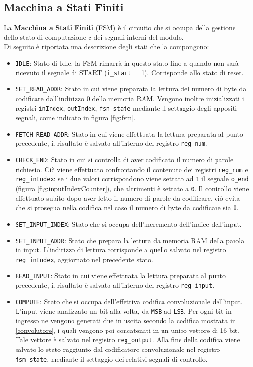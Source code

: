 \documentclass{article}
\begin{document}
\newpage
\subsection{Macchina a Stati Finiti}
\label{fsm}
La \textbf{Macchina a Stati Finiti} (FSM) è il circuito che si occupa della gestione dello stato di computazione e dei segnali interni del modulo.\\
Di seguito è riportata una descrizione degli stati che la compongono:

\begin{itemize}
    \item \texttt{IDLE}: Stato di Idle, la FSM rimarrà in questo stato fino a quando non sarà ricevuto il segnale di START (\texttt{i\_start} = 1). Corrisponde allo stato di reset.
    \item \texttt{SET\_READ\_ADDR}: Stato in cui viene preparata la lettura del numero di byte da codificare dall'indirizzo 0 della memoria RAM. Vengono inoltre inizializzati i registri \texttt{inIndex}, \texttt{outIndex}, \texttt{fsm\_state} mediante il settaggio degli appositi segnali, come indicato in figura \ref{fig:fsm}.
    \item \texttt{FETCH\_READ\_ADDR}: Stato in cui viene effettuata la lettura preparata al punto precedente, il risultato è salvato all'interno del registro \texttt{reg\_num}.
    \item \texttt{CHECK\_END}: Stato in cui si controlla di aver codificato il numero di parole richiesto. Ciò viene effettuato confrontando il contenuto dei registri \texttt{reg\_num} e \texttt{reg\_inIndex}: se i due valori corrispondono viene settato ad \texttt{1} il segnale \texttt{o\_end} (figura \ref{fig:inputIndexCounter}), che altrimenti è settato a \texttt{0}. Il controllo viene effettuato subito dopo aver letto il numero di parole da codificare, ciò evita che si prosegua nella codifica nel caso il numero di byte da codificare sia 0.
    \item \texttt{SET\_INPUT\_INDEX}: Stato che si occupa dell'incremento dell'indice dell'input.
    \item \texttt{SET\_INPUT\_ADDR}: Stato che prepara la lettura da memoria RAM della parola in input. L'indirizzo di lettura corrisponde a quello salvato nel registro \texttt{reg\_inIndex}, aggiornato nel precedente stato.
    \item \texttt{READ\_INPUT}: Stato in cui viene effettuata la lettura preparata al punto precedente, il risultato è salvato all'interno del registro \texttt{reg\_input}.
    \item \texttt{COMPUTE}: Stato che si occupa dell'effettiva codifica convoluzionale dell'input. L'input viene analizzato un bit alla volta, da \texttt{MSB} ad \texttt{LSB}. Per ogni bit in ingresso ne vengono generati due in uscita secondo la codifica mostrata in \ref{convolutore}, i quali vengono poi concatenati in un unico vettore di 16 bit. Tale vettore è salvato nel registro \texttt{reg\_output}\text. Alla fine della codifica viene salvato lo stato raggiunto dal codificatore convoluzionale nel registro \texttt{fsm\_state}, mediante il settaggio dei relativi segnali di controllo.

\end{itemize}
\end{document}
